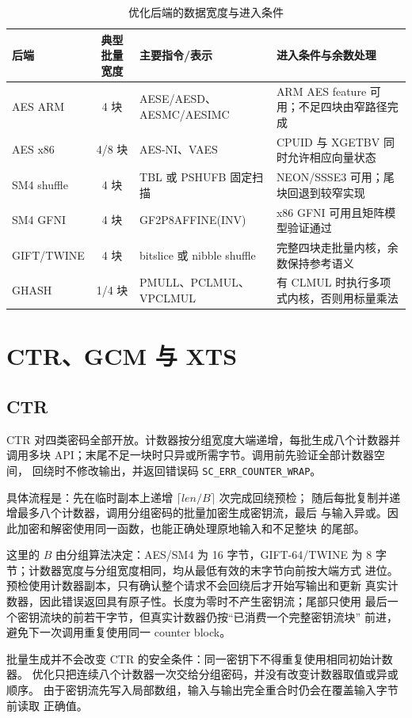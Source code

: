\documentclass[11pt,a4paper,UTF8,fontset=none]{ctexart}
\begin{document}
\begin{table}[htbp]
\centering
\caption{优化后端的数据宽度与进入条件}
\begin{tabularx}{\textwidth}{lclX}
\toprule
后端 & 典型批量宽度 & 主要指令/表示 & 进入条件与余数处理\\
\midrule
AES ARM & 4 块 & AESE/AESD、AESMC/AESIMC &
ARM AES feature 可用；不足四块由窄路径完成\\
AES x86 & 4/8 块 & AES-NI、VAES &
CPUID 与 XGETBV 同时允许相应向量状态\\
SM4 shuffle & 4 块 & TBL 或 PSHUFB 固定扫描 &
NEON/SSSE3 可用；尾块回退到较窄实现\\
SM4 GFNI & 4 块 & GF2P8AFFINE(INV) &
x86 GFNI 可用且矩阵模型验证通过\\
GIFT/TWINE & 4 块 & bitslice 或 nibble shuffle &
完整四块走批量内核，余数保持参考语义\\
GHASH & 1/4 块 & PMULL、PCLMUL、VPCLMUL &
有 CLMUL 时执行多项式内核，否则用标量乘法\\
\bottomrule
\end{tabularx}
\end{table}

\section{CTR、GCM 与 XTS}

\subsection{CTR}

CTR 对四类密码全部开放。计数器按分组宽度大端递增，每批生成八个计数器并
调用多块 API；末尾不足一块时只异或所需字节。调用前先验证全部计数器空间，
回绕时不修改输出，并返回错误码 \texttt{SC\_ERR\_COUNTER\_WRAP}。

具体流程是：先在临时副本上递增 \(\lceil len/B\rceil\) 次完成回绕预检；
随后每批复制并递增最多八个计数器，调用分组密码的批量加密生成密钥流，最后
与输入异或。因此加密和解密使用同一函数，也能正确处理原地输入和不足整块
的尾部。

这里的 \(B\) 由分组算法决定：AES/SM4 为 16 字节，GIFT-64/TWINE 为
8 字节；计数器宽度与分组宽度相同，均从最低有效的末字节向前按大端方式
进位。预检使用计数器副本，只有确认整个请求不会回绕后才开始写输出和更新
真实计数器，因此错误返回具有原子性。长度为零时不产生密钥流；尾部只使用
最后一个密钥流块的前若干字节，但真实计数器仍按“已消费一个完整密钥流块”
前进，避免下一次调用重复使用同一 counter block。

批量生成并不会改变 CTR 的安全条件：同一密钥下不得重复使用相同初始计数器。
优化只把连续八个计数器一次交给分组密码，并没有改变计数器取值或异或顺序。
由于密钥流先写入局部数组，输入与输出完全重合时仍会在覆盖输入字节前读取
正确值。
\end{document}

